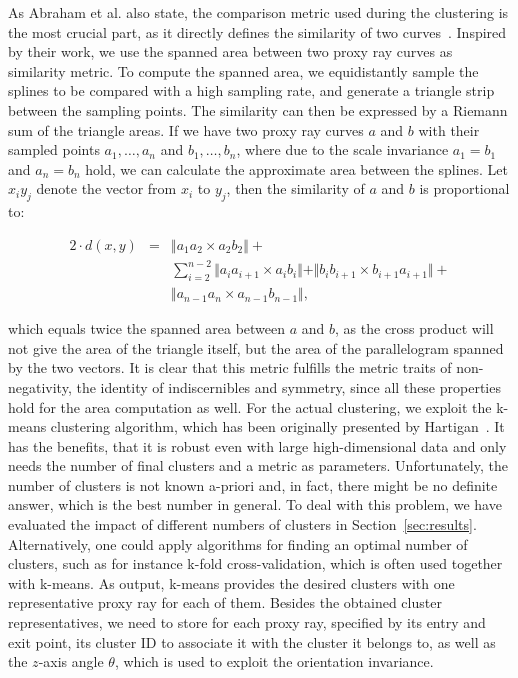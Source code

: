 \documentclass[review,journal]{vgtc}         %
\begin{document}
As Abraham et al. also state, the comparison metric used during the clustering is the most crucial part, as it directly defines the similarity of two curves~\cite{abraham03clustering}. Inspired by their work, we use the spanned area between two proxy ray curves as similarity metric. To compute the spanned area, we equidistantly sample the splines to be compared with a high sampling rate, and generate a triangle strip between the sampling points. The similarity can then be expressed by a Riemann sum of the triangle areas. If we have two proxy ray curves $a$ and $b$ with their sampled points $a_1,\dots,a_n$ and $b_1,\dots,b_n$, where due to the scale invariance $a_1=b_1$ and $a_n=b_n$ hold, we can calculate the approximate area between the splines. Let $x_iy_j$ denote the vector from $x_i$ to $y_j$, then the similarity of $a$ and $b$ is proportional to:

\begin{eqnarray*}
2\cdot d(x,y) &=& \Vert a_1a_2 \times a_2b_2\Vert + \\
&& \sum_{i=2}^{n-2}\Vert a_ia_{i+1} \times a_ib_i \Vert + \Vert b_ib_{i+1} \times b_{i+1}a_{i+1}\Vert + \\
&& \Vert a_{n-1}a_n \times a_{n-1}b_{n-1}\Vert,
\end{eqnarray*}

\noindent which equals twice the spanned area between $a$ and $b$, as the cross product will not give the area of the triangle itself, but the area of the parallelogram spanned by the two vectors. It is clear that this metric fulfills the metric traits of non-negativity, the identity of indiscernibles and symmetry, since all these properties hold for the area computation as well. For the actual clustering, we exploit the k-means clustering algorithm, which has been originally presented by Hartigan~\cite{hartigan75kmeans}. It has the benefits, that it is robust even with large high-dimensional data and only needs the number of final clusters and a metric as parameters. Unfortunately, the number of clusters is not known a-priori and, in fact, there might be no definite answer, which is the best number in general. To deal with this problem, we have evaluated the impact of different numbers of clusters in Section~\ref{sec:results}. Alternatively, one could apply algorithms for finding an optimal number of clusters, such as for instance k-fold cross-validation, which is often used together with k-means. As output, k-means provides the desired clusters with one representative proxy ray for each of them. Besides the obtained cluster representatives, we need to store for each proxy ray, specified by its entry and exit point, its cluster ID to associate it with the cluster it belongs to, as well as the $z$-axis angle $\theta$, which is used to exploit the orientation invariance.
\end{document}
